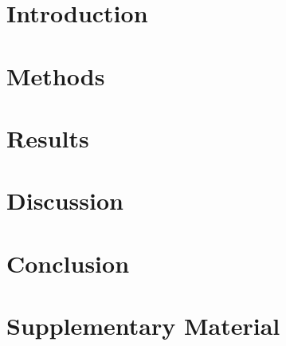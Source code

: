 \documentclass[12pt, oneside]{smuthesis}
\begin{document}
\tableofcontents
\listoffigures
\listoftables
\newpage
%


\mainmatter
\chapter{Introduction}

\newpage

\chapter{Methods}

\newpage


\chapter{Results}

\newpage

\chapter{Discussion}

\newpage

\chapter{Conclusion}

\newpage

\appendix
\chapter{Supplementary Material}

\newpage


\begin{singlespace}
    
\end{singlespace}
\end{document}
